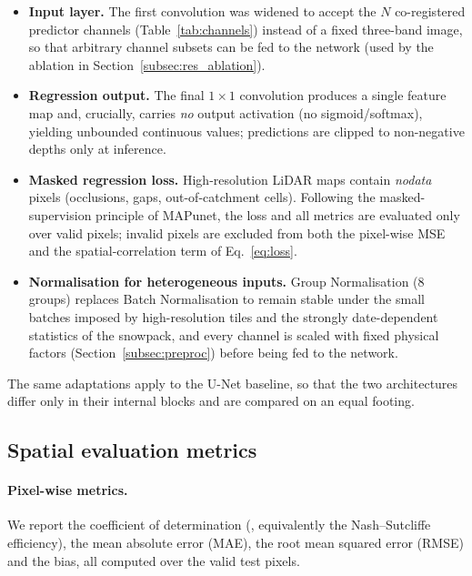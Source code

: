 \begin{itemize}
  \item \textbf{Input layer.} The first convolution was widened to accept the
  $N$ co-registered predictor channels (Table~\ref{tab:channels}) instead of a
  fixed three-band image, so that arbitrary channel subsets can be fed to the
  network (used by the ablation in Section~\ref{subsec:res_ablation}).

  \item \textbf{Regression output.} The final $1\times1$ convolution produces a
  single feature map and, crucially, carries \emph{no} output activation (no
  sigmoid/softmax), yielding unbounded continuous values; predictions are
  clipped to non-negative depths only at inference.

  \item \textbf{Masked regression loss.} High-resolution LiDAR maps contain
  \textit{nodata} pixels (occlusions, gaps, out-of-catchment cells). Following
  the masked-supervision principle of MAPunet, the loss and all metrics are
  evaluated only over valid pixels; invalid pixels are excluded from both the
  pixel-wise MSE and the spatial-correlation term of
  Eq.~\eqref{eq:loss}.

  \item \textbf{Normalisation for heterogeneous inputs.} Group Normalisation
  (8 groups) replaces Batch Normalisation to remain stable under the small
  batches imposed by high-resolution tiles and the strongly date-dependent
  statistics of the snowpack, and every channel is scaled with fixed physical
  factors (Section~\ref{subsec:preproc}) before being fed to the network.
\end{itemize}

\noindent The same adaptations apply to the U-Net baseline, so that the two
architectures differ only in their internal blocks and are compared on an equal
footing.

\subsection{Spatial evaluation metrics}
\label{subsec:metrics}

\paragraph{Pixel-wise metrics.}
We report the coefficient of determination (\Rsq{}, equivalently the
Nash--Sutcliffe efficiency), the mean absolute error (MAE), the root mean
squared error (RMSE) and the bias, all computed over the valid test pixels.

